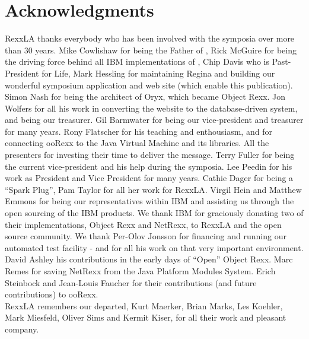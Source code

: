 \small
\chapter*{Acknowledgments}
\begin{multicols*}{2}
RexxLA thanks everybody who has been involved with the \rexx{} symposia over more than 30 years. Mike Cowlishaw for being the Father of \rexx{}, Rick McGuire for being the driving force behind all IBM implementations of \rexx{}, Chip Davis who is Past-President for Life, Mark Hessling for maintaining Regina and building our wonderful symposium application and web site (which enable this publication). Simon Nash for being the architect of Oryx, which became Object Rexx. Jon Wolfers for all his work in converting the website to the database-driven system, and being our treasurer. Gil Barmwater for being our vice-president and treasurer for many years. Rony Flatscher for his teaching and enthousiasm, and for connecting ooRexx to the Java Virtual Machine and its libraries. All the presenters for investing their time to deliver the message. Terry Fuller for being the current vice-president and his help during the symposia. Lee Peedin for his work as President and Vice President for many years. Cathie Dager for being a \rexx{} ``Spark Plug'', Pam Taylor for all her work for RexxLA. Virgil Hein and Matthew Emmons for being our representatives within IBM and assisting us through the open sourcing of the IBM products. We thank IBM for graciously donating two of their \rexx{} implementations, Object Rexx and NetRexx, to RexxLA and the open source community. We thank Per-Olov Jonsson for financing and running our automated test facility - and for all his work on that very important environment. David Ashley his contributions in the early days of ``Open'' Object Rexx. Marc Remes for saving NetRexx from the Java Platform Modules System. Erich Steinbock and Jean-Louis Faucher for their contributions (and future contributions) to ooRexx. 
\\[0.5cm]
RexxLA remembers our departed, Kurt Maerker, Brian Marks, Les Koehler, Mark Miesfeld, Oliver Sims and Kermit Kiser, for all their work and pleasant company.
\end{multicols*}
